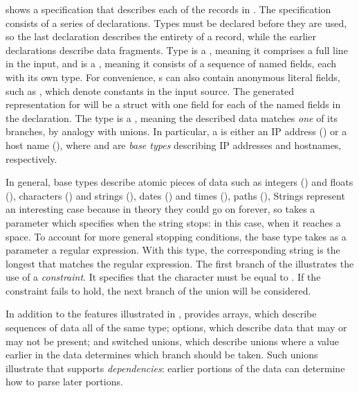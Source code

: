  shows a \padsc{} specification that describes each
of the records in .  The specification consists of a
series of declarations. Types must be declared before they are used,
so the last declaration  describes the entirety of a
record, while the earlier declarations describe data fragments.  Type
 is a , meaning it comprises a full line in
the input, and is a , meaning it consists of a sequence of
named fields, each with its own type.  For convenience, s
can also contain anonymous literal fields, such as \cd{" ["}, which
denote constants in the input source.  The generated representation
for  will be a \C{} struct with one field for each of the
named fields in the declaration.
The type  is a , meaning the described data
matches \textit{one} of its branches, by analogy with \C{} unions. In
particular, a  is either an IP address () or a
host name (), where  and  are
\padsc{} \textit{base types} describing IP addresses and hostnames,
respectively.  

In general, base types describe atomic pieces of data such as integers
() and floats (), characters () and
strings (), dates () and times
(), paths (), \etc{} Strings represent an
interesting case because in theory they could go on forever, so
 takes a parameter which specifies when the string stops:
in this case, when it reaches a space.  To account for more general
stopping conditions, the base type  takes as a
parameter a regular expression.  With this type, the corresponding
string is the longest that matches the regular expression.
The first branch of the   illustrates the
use of a \textit{constraint}.  It specifies that the 
character must be equal to .  If the constraint fails to hold,
the next branch of the union will be considered.  

In addition to the features illustrated in , \pads{}
provides arrays, which describe sequences of data all of the same
type; options, which describe data that may or may not be present; and
switched unions, which describe unions where a value earlier in the
data determines which branch should be taken.  Such unions illustrate that
\pads{} supports \textit{dependencies}: earlier portions of the data
can determine how to parse later portions.

